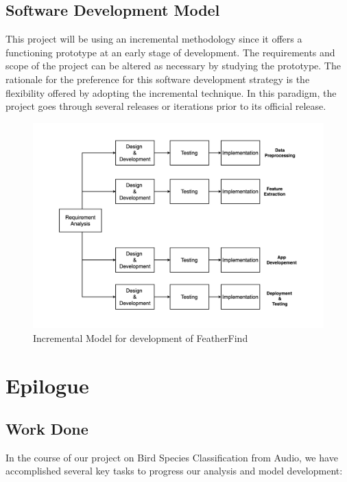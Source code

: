 \newpage
\section{Software Development Model}
This project will be using an incremental methodology since it offers a
functioning prototype at an early stage of development. The requirements and
scope of the project can be altered as necessary by studying the prototype. The
rationale for the preference for this software development strategy is the
flexibility offered by adopting the incremental technique. In this paradigm,
the project goes through several releases or iterations prior to its official
release.
\begin{figure}[h!]
    \includegraphics[scale=0.25]{images/SDLC.png}
    \caption{Incremental Model for development of
        FeatherFind}%
\end{figure}
\newpage

\chapter{Epilogue}
\section{Work Done}
In the course of our project on Bird Species Classification from Audio, we have
accomplished several key tasks to progress our analysis and model development:

